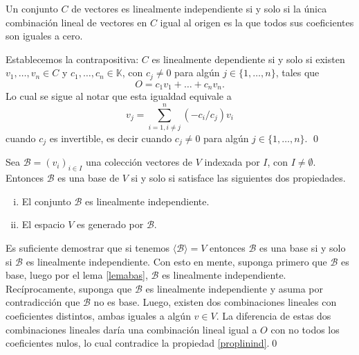 \begin{prop}\label{proplinind}
Un conjunto $C$ de vectores es linealmente independiente si y solo si la única combinación lineal de vectores en $C$ igual al origen es la que todos sus coeficientes son iguales a cero.
\end{prop}

\dem Establecemos la contrapositiva: $C$ es linealmente dependiente si y solo si existen $v_1,\ldots,v_n\in C$ y $c_1,\ldots,c_n\in \mathbb{K}$, con $c_j\ne 0$ para alg\'un $j\in\{1,\ldots, n\}$, tales que
\[
O=c_1v_1+\ldots+c_nv_n.
\]
Lo cual se sigue al notar que esta igualdad equivale a
\[
v_j=\sum_{i=1,i\ne j}^n (-c_i/c_j)v_i
\]
cuando $c_j$ es invertible, es decir cuando $c_j\ne 0$ para algún $j\in\{1,\ldots,n\}$.
\qed

\begin{teo}\label{defbase2}
Sea $\mathcal{B}=(v_i)_{i\in I}$ una colección vectores de $V$ indexada por $I$, con $I\ne\emptyset$. Entonces $\mathcal{B}$ es una base de $V$ si y solo si satisface las siguientes dos propiedades.
\begin{enumerate}[(i)]
\item El conjunto $\mathcal{B}$ es linealmente independiente.
\item El espacio $V$ es generado por $\mathcal{B}$.
\end{enumerate}
\end{teo}

\dem Es suficiente demostrar que si tenemos $\langle \mathcal{B}\rangle=V$ entonces $\mathcal{B}$ es una base si y solo si $\mathcal{B}$ es linealmente independiente. Con esto en mente, suponga primero que $\mathcal{B}$ es base, luego por el lema \ref{lemabas}, $\mathcal{B}$ es linealmente independiente. Recíprocamente, suponga que $\mathcal{B}$ es linealmente independiente y asuma por contradicci\'on que $\mathcal{B}$ no es base. Luego, existen dos combinaciones lineales con coeficientes distintos, ambas iguales a alg\'un $v\in V$. La diferencia de estas dos combinaciones lineales dar\'ia una combinaci\'on lineal igual a $O$ con no todos los coeficientes nulos, lo cual contradice la propiedad \ref{proplinind}.\qed

